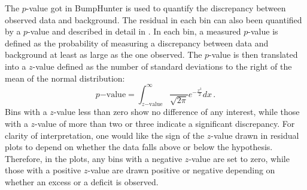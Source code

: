 The $p$-value got in BumpHunter is used to quantify the discrepancy between observed data and background. 
The residual in each bin can also been quantified by a $p$-value and described in detail in \cite{Choudalakis:2011bh}. 
In each bin, a measured $p$-value is defined as the probability of measuring a discrepancy between data and background at least as large as the one observed. 
The $p$-value is then translated into a $z$-value defined as the number of standard deviations to the right of the mean of the normal distribution:
\begin{equation}
p\mathrm{-value} = \int_{z\mathrm{-value}}^{\infty}\frac{}{\sqrt{2\pi}}e^{-\frac{x^{2}}{2}}dx\,.
\end{equation}
Bins with a $z$-value less than zero show no difference of any interest, while those with a $z$-value of more than two or three indicate a significant discrepancy. 
For clarity of interpretation, one would like the sign of the $z$-value drawn in residual plots to depend on whether the data falls above or below the hypothesis. 
Therefore, in the plots, any bins with a negative $z$-value are set to zero, while those with a positive $z$-value are drawn positive or negative depending on whether an excess or a deficit is observed.

